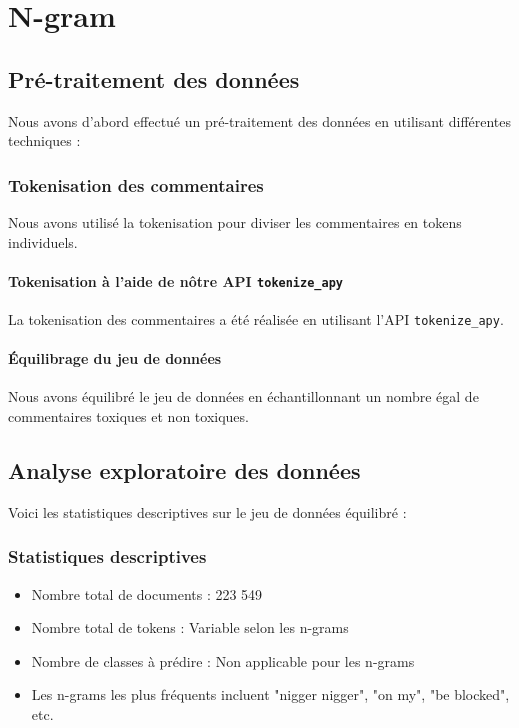 \chapter{N-gram}

\section{Pré-traitement des données}

Nous avons d'abord effectué un pré-traitement des données en utilisant différentes techniques :

\subsection{Tokenisation des commentaires}

Nous avons utilisé la tokenisation pour diviser les commentaires en tokens individuels.

\subsubsection*{Tokenisation à l'aide de nôtre API \texttt{tokenize\_apy}}

La tokenisation des commentaires a été réalisée en utilisant l'API \texttt{tokenize\_apy}.

\subsubsection*{Équilibrage du jeu de données}

Nous avons équilibré le jeu de données en échantillonnant un nombre égal de commentaires toxiques et non toxiques.

\section{Analyse exploratoire des données}

Voici les statistiques descriptives sur le jeu de données équilibré :

\subsection{Statistiques descriptives}

\begin{itemize}
    \item Nombre total de documents : 223 549
    \item Nombre total de tokens : Variable selon les n-grams
    \item Nombre de classes à prédire : Non applicable pour les n-grams
    \item Les n-grams les plus fréquents incluent "nigger nigger", "on my", "be blocked", etc.
\end{itemize}

